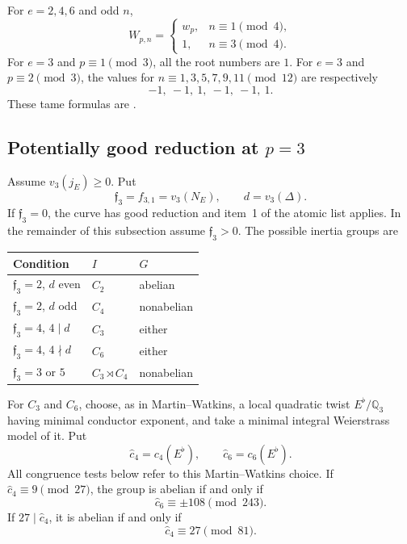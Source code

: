 \documentclass[11pt,reqno]{amsart}
\theoremstyle{definition}
\theoremstyle{remark}
\newcommand{\Q}{\mathbb Q}
\begin{document}
For $e=2,4,6$ and odd $n$,
\begin{equation}\label{eq:root-e246}
 W_{p,n}=
 \begin{cases}
 w_p,&n\equiv1\pmod4,\\
 1,&n\equiv3\pmod4.
 \end{cases}
\end{equation}
For $e=3$ and $p\equiv1\pmod3$, all the root numbers are $1$.  For $e=3$
and $p\equiv2\pmod3$, the values for
$n\equiv1,3,5,7,9,11\pmod{12}$ are respectively
\begin{equation}\label{eq:e3-root-sequence}
 -1,\ -1,\ 1,\ -1,\ -1,\ 1.
\end{equation}
These tame formulas are \cite[Propositions~5.1 and 6.1]{DMW}.

\subsection{Potentially good reduction at \texorpdfstring{$p=3$}{p=3}}

Assume $v_3(j_E)\geq0$.  Put
\begin{equation*}
 \mathfrak f_3=f_{3,1}=v_3(N_E),\qquad d=v_3(\Delta).
\end{equation*}
If $\mathfrak f_3=0$, the curve has good reduction and item~1 of the atomic
list applies.  In the remainder of this subsection assume
$\mathfrak f_3>0$.
The possible inertia groups are
\begin{center}
\begin{tabular}{@{}lll@{}}
\toprule
Condition & $I$ & $G$ \\
\midrule
$\mathfrak f_3=2$, $d$ even & $C_2$ & abelian \\
$\mathfrak f_3=2$, $d$ odd & $C_4$ & nonabelian \\
$\mathfrak f_3=4$, $4\mid d$ & $C_3$ & either \\
$\mathfrak f_3=4$, $4\nmid d$ & $C_6$ & either \\
$\mathfrak f_3=3$ or $5$ & $C_3\rtimes C_4$ & nonabelian \\
\bottomrule
\end{tabular}
\end{center}
For $C_3$ and $C_6$, choose, as in Martin--Watkins, a local quadratic twist
$E^\flat/\Q_3$ having minimal conductor exponent, and take a minimal integral
Weierstrass model of it.  Put
\begin{equation*}
 \widehat c_4=c_4(E^\flat),\qquad
 \widehat c_6=c_6(E^\flat).
\end{equation*}
All congruence tests below refer to this Martin--Watkins choice.  If
$\widehat c_4\equiv9\pmod{27}$, the group is abelian if and only if
\begin{equation}\label{eq:p3-abelian-test1}
 \widehat c_6\equiv\pm108\pmod{243}.
\end{equation}
If $27\mid\widehat c_4$, it is abelian if and only if
\begin{equation}\label{eq:p3-abelian-test2}
 \widehat c_4\equiv27\pmod{81}.
\end{equation}
\end{document}
